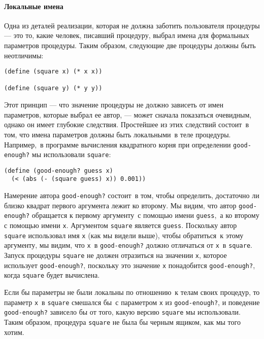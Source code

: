\paragraph{Локальные имена}


Одна из деталей реализации, которая не должна заботить
пользователя процедуры  --- это то, какие человек, писавший процедуру, 
выбрал имена для формальных параметров процедуры. Таким образом,
следующие две процедуры должны быть неотличимы:

\begin{Verbatim}[fontsize=\small]
(define (square x) (* x x))

(define (square y) (* y y))
\end{Verbatim}
Этот принцип --- что значение процедуры не должно зависеть от имен
параметров, которые выбрал ее автор, --- может сначала показаться
очевидным, однако он имеет глубокие следствия.  Простейшее из этих 
следствий состоит~в том, что имена параметров должны быть локальными~в 
теле процедуры.  Например,~в программе вычисления квадратного корня
при определении {\tt good-enough?} мы использовали
{\tt square}: 

\begin{Verbatim}[fontsize=\small]
(define (good-enough? guess x)
  (< (abs (- (square guess) x)) 0.001))
\end{Verbatim}
Намерение автора {\tt good-enough?} состоит~в том, чтобы
определить, достаточно ли близко квадрат первого аргумента лежит ко
второму.  Мы видим, что автор {\tt good-enough?} обращается к
первому аргументу~с помощью имени {\tt guess},~а ко второму с
помощью имени {\tt x}. Аргументом {\tt square} является
{\tt guess}.   Поскольку автор {\tt square} использовал
имя {\tt x} (как мы видели выше), чтобы обратиться~к этому
аргументу, мы видим, что {\tt x}~в {\tt good-enough?}
должно отличаться от {\tt x}~в {\tt square}. Запуск
процедуры {\tt square} не должен отразиться на значении
{\tt x}, которое использует {\tt good-enough?},
поскольку это значение {\tt x} понадобится
{\tt good-enough?}, когда {\tt square} будет
вычислена.

Если бы параметры не были локальны по отношению~к телам
своих процедур, то параметр {\tt x}~в {\tt square}
смешался бы~с параметром {\tt x} из {\tt good-enough?},
и поведение {\tt good-enough?} зависело бы от того, какую
версию {\tt square} мы использовали. Таким образом,
процедура {\tt square} не была бы черным ящиком, как мы того хотим.

